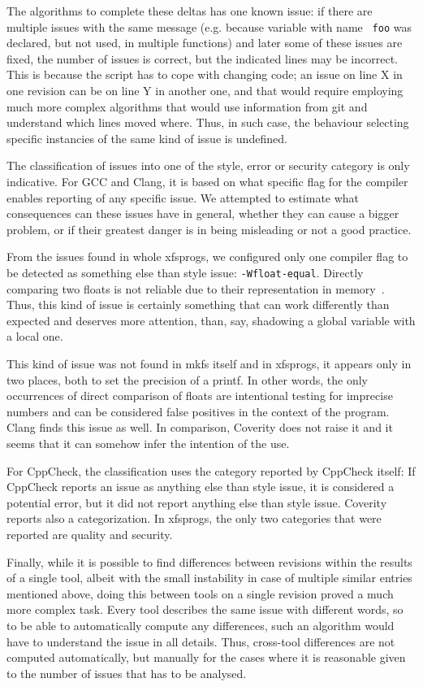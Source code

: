 The algorithms to complete these deltas has one known issue: if there are
multiple issues with the same message (e.g. because variable with name {\tt
				       foo} was declared, but not used, in
				       multiple functions) and later some of
these issues are fixed, the number of issues is correct, but the indicated
lines may be incorrect. This is because the script has to cope with changing
code; an issue on line X in one revision can be on line Y in another one, and
that would require employing much more complex algorithms that would use
information from git and understand which lines moved where. Thus, in such
case, the behaviour selecting specific instancies of the same kind of issue is
undefined.


The classification of issues into one of the style, error or security category
is only indicative. For GCC and Clang, it is based on what specific flag for the
compiler enables reporting of any specific issue. We attempted to estimate what
consequences can these issues have in general, whether they can cause a bigger
problem, or if their greatest danger is in being misleading or not a good
practice.

From the issues found in whole xfsprogs, we configured only one compiler flag
to be detected as something else than style issue: {\tt -Wfloat-equal}.
Directly comparing two floats is not reliable due to their representation
in memory~\cite{floatsComparing}. Thus, this kind of issue is certainly
something that can work differently than expected and deserves more
attention, than, say, shadowing a global variable with a local one.

This kind of issue was not found in mkfs itself and in xfsprogs, it appears
only in two places, both to set the precision of a printf. In other words,
the only occurrences of direct comparison of floats are intentional testing
for imprecise numbers and can be considered false positives in the context
of the program. Clang finds this issue as well. In comparison, Coverity
does not raise it and it seems that it can somehow infer the intention of
the use.

For CppCheck, the classification uses the category reported by CppCheck itself:
If CppCheck reports an issue as anything else than style issue, it is
considered a potential error, but it did not report anything else than style
issue. Coverity reports also a categorization. In xfsprogs, the only two
categories that were reported are quality and security.

Finally, while it is possible to find differences between revisions within the
results of a single tool, albeit with the small instability in case of multiple
similar entries mentioned above, doing this between tools on a single revision
proved a much more complex task. Every tool describes the same issue with
different words, so to be able to automatically compute any differences, such
an algorithm would have to understand the issue in all details. Thus,
   cross-tool differences are not computed automatically, but manually for the
   cases where it is reasonable given to the number of issues that has to be
   analysed.
